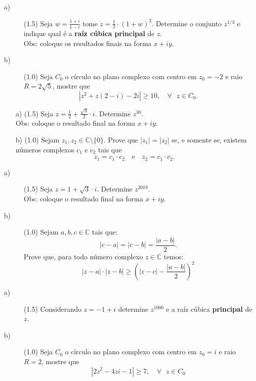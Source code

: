 \problem
\begin{description} 
\item[a)] (1.5) Seja $w= \frac{1+i}{1-i}$ tome $z=\frac{1}{2}\cdot (1+w)^2$. 
Determine o conjunto $z^{1/3}$ e indique qual \'e a \textbf{ra\'iz c\'ubica principal} de $z$. \\
{\small Obs: coloque os resultados finais na forma $x+iy$.}

\item[b)] (1.0) Seja $C_0$ o c\'irculo no plano complexo com centro em $z_0=-2$ e raio $R=2\sqrt{5}$, mostre que 
\[\left| z^2+z(2-i)-2i  \right| \geq 10, \quad \forall \text{ } z\in C_0.\]
\end{description}


\problem
\begin{itemize}
\item[a)] (1.5) Seja $z=\frac{1}{2}+\frac{\sqrt{3}}{2}\cdot i$. 
Determine  $z^{30}$. \\
{\small Obs: coloque o resultado final na forma $x+iy$.}

\item[b)] (1.0) Sejam $z_1,z_2 \in \mathbb C \setminus \{0\}$. Prove que $|z_1|=|z_2|$ se, e somente se, existem n\'umeros complexos $c_1$ e $c_2$ tais que
\[z_1=c_1\cdot c_2 \quad \text{e} \quad z_2 = c_1\cdot \overline{c_2}.\]
\end{itemize}


\problem
\begin{description} 
\item[a)] (1.5) Seja $z=1+\sqrt{3}\cdot i$. 
Determine  $z^{2019}$. \\
{\small Obs: coloque o resultado final na forma $x+iy$.}


\item[b)] (1.0) Sejam $a,b,c \in \mathbb C$ tais que:
\[|c-a| = |c-b| = \frac{|a-b|}{2}.\]
Prove que, para todo n\'umero complexo $z\in \mathbb C$ temos:
\[|z-a| \cdot |z-b| \geq \left(|z-c| - \frac{|a-b|}{2} \right)^2\]

\end{description}


\problem
\begin{description}
\item[a)] (1.5) Considerando $z=-1+i$ determine $z^{1000}$ e a ra\'iz c\'ubica \textbf{principal} de $z$.
\item[b)] (1.0) Seja $C_0$ o c\'irculo no plano complexo com centro em $z_0=i$ e raio $R=2$, mostre que 
\[\left| 2z^2-4zi-1  \right| \geq 7, \quad \forall \text{ } z\in C_0\]
\end{description}



